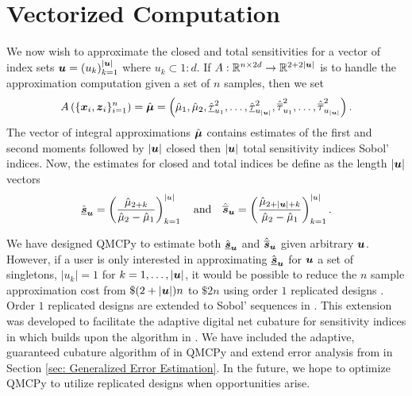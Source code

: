 \documentclass{article}
\begin{document}
\section{Vectorized Computation}

We now wish to approximate the closed and total sensitivities for a vector of index sets $\boldsymbol{u} = \left(u_k\right)_{k=1}^{\lvert \boldsymbol{u} \rvert}$ where $u_k \subset 1:d$. If $A: \mathbb{R}^{n \times 2d} \to \mathbb{R}^{2+2\lvert \boldsymbol{u} \rvert}$ is to handle the approximation computation given a set of $n$ samples, then we set
\begin{equation}
    A\left(\{\boldsymbol{x}_i,\boldsymbol{z}_i\}_{i=1}^n\right) = \hat{\boldsymbol{\mu}} = \left(\hat{\mu}_1,\hat{\mu}_2,\hat{\underline{\tau}}_{u_1}^2,\dots,\hat{\underline{\tau}}_{u_{\lvert \boldsymbol{u} \rvert}}^2,\hat{\overline{\tau}}_{u_1}^2,\dots,\hat{\overline{\tau}}_{u_{\lvert \boldsymbol{u} \rvert}}^2\right).
\end{equation}
The vector of integral approximations $\hat{\boldsymbol{\mu}}$ contains estimates of the first and second moments followed by $\lvert \boldsymbol{u} \rvert$ closed then $\lvert \boldsymbol{u} \rvert$ total sensitivity indices Sobol' indices. Now, the  estimates for closed and total indices be define as the length $\lvert \boldsymbol{u} \rvert$ vectors
\begin{equation}
    \hat{\underline{\boldsymbol{s}}}_{\boldsymbol{u}} = \left(\frac{\hat{\mu}_{2+k}}{\hat{\mu}_2-\hat{\mu}_1}\right)_{k=1}^{\lvert u \rvert} \quad \text{and} \quad 
    \hat{\overline{\boldsymbol{s}}}_{\boldsymbol{u}} = \left(\frac{\hat{\mu}_{2+\lvert \boldsymbol{u} \rvert + k}}{\hat{\mu}_2-\hat{\mu}_1}\right)_{k=1}^{\lvert u \rvert}.
\end{equation}

We have designed QMCPy to estimate both $\hat{\underline{\boldsymbol{s}}}_{\boldsymbol{u}}$ and $\hat{\overline{\boldsymbol{s}}}_{\boldsymbol{u}}$ given arbitrary $\boldsymbol{u}$. However, if a user is only interested in approximating $\hat{\underline{\boldsymbol{s}}}_{\boldsymbol{u}}$ for $\boldsymbol{u}$ a set of singletons, $\lvert u_k \rvert = 1$ for $k=1, \dots, \lvert \boldsymbol{u} \rvert$, it would be possible to reduce the $n$ sample approximation cost from $\$(2+\lvert \boldsymbol{u} \rvert)n$ to $\$2n$ using order $1$ replicated designs \cite{alex2008comparison,tissot2015randomized}. Order $1$ replicated designs are extended to Sobol' sequences  in \cite{replicated_designs_sobol_seq}. This extension was developed to facilitate the adaptive digital net cubature for sensitivity indices in \cite{reliable_sobol_indices_approx} which builds upon the algorithm in \cite{cubqmcsobol}. We have included the adaptive, guaranteed cubature algorithm of \cite{cubqmcsobol} in QMCPy and extend error analysis from \cite{reliable_sobol_indices_approx} in Section \ref{sec: Generalized Error Estimation}. In the future, we hope to optimize QMCPy to utilize replicated designs when opportunities arise.
\end{document}
